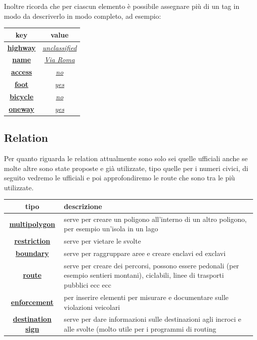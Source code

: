 \documentclass[a4paper,twoside,12pt,]{article}
\newcommand{\key}[1]{\underline{\textbf{#1}}}
\newcommand{\val}[1]{\underline{\textit{#1}}}
\begin{document}
Inoltre ricorda che per ciascun elemento è possibile assegnare più di un tag in modo da descriverlo in modo completo, ad esempio:
\begin{center}
 \begin{tabular}{cc}
  \toprule
   \textbf{key} & \textbf{value} \\
  \midrule
   \key{highway} & \val{unclassified} \\
   \key{name} & \val{Via Roma} \\
   \key{access} & \val{no} \\
   \key{foot} & \val{yes} \\
   \key{bicycle} & \val{no} \\
   \key{oneway} & \val{yes} \\
  \bottomrule
 \end{tabular}
\end{center}
\subsection{Relation}
Per quanto riguarda le relation attualmente sono solo sei quelle ufficiali anche se molte altre sono state proposte e già utilizzate, tipo quelle per i numeri civici, di seguito vedremo le ufficiali e poi approfondiremo le route che sono tra le più utilizzate.
\begin{center}
 \begin{tabular}{c p{9cm}}
  \toprule
   \textbf{tipo} & \textbf{descrizione} \\
  \midrule
   \key{multipolygon} & serve per creare un poligono all'interno di un altro poligono, per esempio un'isola in un lago \\
   \key{restriction}	& serve per vietare le svolte \\
   \key{boundary}	& serve per raggruppare aree e creare enclavi ed exclavi \\
   \key{route} & serve per creare dei percorsi, possono essere pedonali (per esempio sentieri montani), ciclabili, linee di trasporti pubblici ecc ecc \\
   \key{enforcement} & per inserire elementi per misurare e documentare sulle violazioni veicolari \\
   \key{destination sign} & serve per dare informazioni sulle destinazioni agli incroci e alle svolte (molto utile per i programmi di routing \\
  \bottomrule
\end{tabular}
\end{center}
\end{document}
